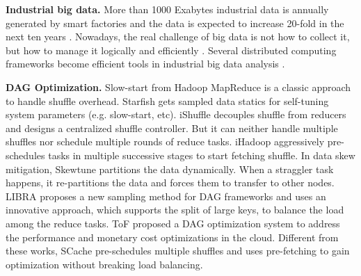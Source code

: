 {\textbf{Industrial big data.}
More than 1000 Exabytes industrial data is annually generated by smart factories and the data is expected to increase 20-fold in the next ten years \cite{yin2015big}.
Nowadays, the real challenge of big data is not how to collect it, but how to manage it logically and efficiently \cite{lv2017next}.
Several distributed computing frameworks become efficient tools in industrial big data analysis \cite{lade2017manufacturing, li2016scientific, ur2018big}.
}

{\color{black}
\textbf{DAG Optimization.} 
Slow-start from Hadoop MapReduce is a classic approach to handle shuffle overhead. 
Starfish \cite{starfish} gets sampled data statics for self-tuning system parameters (e.g. slow-start, etc). 
iShuffle \cite{guo2017ishuffle} decouples shuffle from reducers and designs a centralized shuffle controller. 
But it can neither handle multiple shuffles nor schedule multiple rounds of reduce tasks. 
iHadoop \cite{ihadoop} aggressively pre-schedules tasks in multiple successive stages to start fetching shuffle. 
In data skew mitigation, 
Skewtune \cite{skewtune} partitions the data dynamically. When a straggler task happens, it re-partitions the data and forces them to transfer to other nodes.
LIBRA \cite{chen2014libra} proposes a new sampling method for DAG frameworks and uses an innovative approach, which supports the split of large keys, to balance the load among the reduce tasks.
ToF \cite{zhou2014transformation} proposed a DAG optimization system to address the performance and monetary cost optimizations in the cloud.
Different from these works, SCache pre-schedules multiple shuffles and uses pre-fetching to gain optimization without breaking load balancing. 
}
